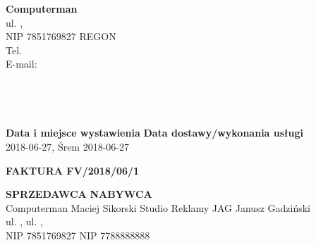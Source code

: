 \documentclass[a4paper,10pt]{article}
\date{}
\begin{document}
    \noindent
    \textbf{Computerman}\\
    ul.  ,  \\
    NIP 7851769827 REGON \\
    Tel. \\
    E-mail: \\
    \\
    \\
    
    \\
    \\
  
\noindent
    \textbf{Data i miejsce wystawienia}		\hfill \textbf{Data dostawy/wykonania usługi}\\
    2018-06-27, Śrem							        \hfill	2018-06-27\\
  
    \begin{center}
    \textbf{\huge{FAKTURA FV/2018/06/1}}
    \end{center}
    \vspace{2cm}
  
    \noindent
    \textbf{SPRZEDAWCA}						\hfill \textbf{NABYWCA}\\
    Computerman Maciej Sikorski					                        \hfill Studio Reklamy JAG Janusz Gadziński\\
    ul.  ,  								            \hfill ul.  ,  \\
    NIP 7851769827								        \hfill NIP 7788888888\\
  
\end{document}
